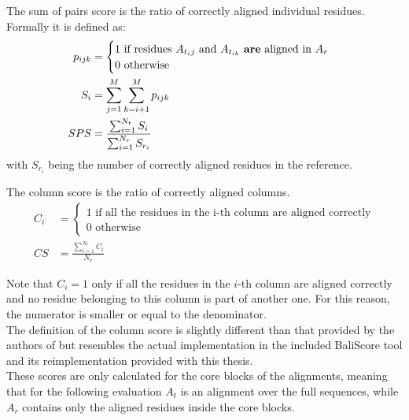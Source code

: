 \begin{mydef}
	The sum of pairs score is the ratio of correctly aligned individual residues. Formally it is defined as:
	\begin{align*}
		p_{ijk} &= \begin{cases}
		1 \text{ if residues $A_{t{_ij}}$ and $A_{t_{ik}}$ \textbf{are} aligned in $A_r$}\\
		0 \text{ otherwise}
		\end{cases} \\
		S_i &= \sum_{j=1}^{M} \sum_{k=i+1}^{M} p_{ijk} \\
		SPS &= \frac{\sum_{i=1}^{N_t} S_i} {\sum_{i=1}^{N_r} S_{r_i}}
 	\end{align*}
 	with $S_{r_i}$ being the number of correctly aligned residues in the reference.
\end{mydef}

\begin{mydef}
	The column score is the ratio of correctly aligned columns. 
	\begin{align*}
	C_i &= \begin{cases}
	1 \text{ if all the residues in the i-th column are aligned correctly}\\
	0 \text{ otherwise}
	\end{cases} \\
	CS &= \frac{\sum_{i=1}^{N_t} C_i}{N_r}
	\end{align*}
\end{mydef}
Note that $C_i = 1$ only if all the residues in the $i$-th column are aligned correctly and no residue belonging to this column is part of another one. For this reason, the numerator is smaller or equal to the denominator.\\
The definition of the column score is slightly different than that provided by the authors of \bb \cite{thompson1999comprehensive} but resembles the actual implementation in the included BaliScore tool and its reimplementation provided with this thesis.\\
These scores are only calculated for the core blocks of the \bb alignments, meaning that for the following evaluation $A_t$ is an alignment over the full sequences, while $A_r$ contains only the aligned residues inside the core blocks.


